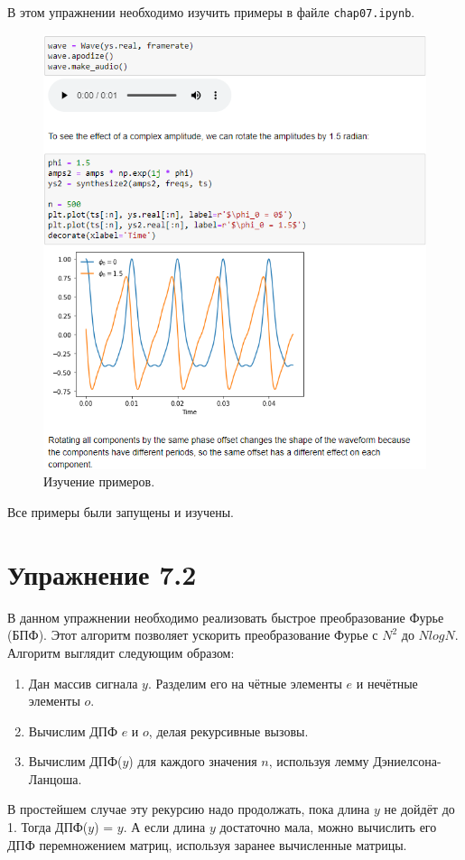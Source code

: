 \documentclass[a4paper, 14pt]{extarticle}
\begin{document}
    В этом упражнении необходимо изучить примеры в файле \texttt{chap07.ipynb}.

    \begin{figure}[h]
        \centering
        \includegraphics[width=0.8\linewidth]{resources/Images/task1_check}
        \caption{Изучение примеров.}
        \label{fig:task1_test_analyze1}
    \end{figure}

    Все примеры были запущены и изучены.

    \newpage

    \section{Упражнение 7.2}
    \label{sec:task2}

    В данном упражнении необходимо реализовать быстрое преобразование Фурье (БПФ). Этот алгоритм позволяет ускорить
    преобразование Фурье с $N^2$ до $N log N$. Алгоритм выглядит следующим образом:

    \begin{enumerate}
        \item Дан массив сигнала $y$. Разделим его на чётные элементы $e$ и нечётные элементы $o$.
        \item Вычислим ДПФ $e$ и $o$, делая рекурсивные вызовы.
        \item Вычислим ДПФ($y$) для каждого значения $n$, используя лемму Дэниелсона-Ланцоша.
    \end{enumerate}
    В простейшем случае эту рекурсию надо продолжать, пока длина $y$ не дойдёт до 1. Тогда ДПФ($y$) = $y$.
    А если длина $y$ достаточно мала, можно вычислить его ДПФ перемножением матриц, используя заранее вычисленные матрицы.
\end{document}
